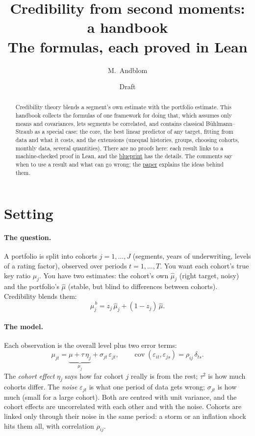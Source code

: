 \documentclass[11pt]{article}
\title{Credibility from second moments: a handbook\\
  {\large The formulas, each proved in Lean}}
\author{M.~Andblom}
\date{Draft}
\theoremstyle{remark}
\newcommand{\hmu}{\hat\mu}
\newcommand{\cov}{\operatorname{cov}}
\begin{document}
\maketitle

\begin{abstract}
  Credibility theory blends a segment's own estimate with the portfolio
  estimate. This handbook collects the formulas of one framework for doing
  that, which assumes only means and covariances, lets segments be correlated,
  and contains classical Bühlmann--Straub as a special case: the core, the best
  linear predictor of any target, fitting from data and what it costs, and the
  extensions (unequal histories, groups, choosing cohorts, monthly data,
  several quantities). There are no proofs here: each result links to a
  machine-checked proof in Lean, and the
  \href{https://mikaelandblom-coder.github.io/credible-lean/}{blueprint}
  has the details. The comments say when to use a result and what can go
  wrong; the \href{https://mikaelandblom-coder.github.io/credible-lean/paper.pdf}{paper}
  explains the ideas behind them.
\end{abstract}

\tableofcontents

\section{Setting}\label{sec:setting}

\paragraph{The question.} A portfolio is split into cohorts
$j = 1, \dots, J$ (segments, years of underwriting, levels of a rating
factor), observed over periods $t = 1, \dots, T$. You want each cohort's
true key ratio $\mu_j$. You have two estimates: the cohort's own $\hmu_j$
(right target, noisy) and the portfolio's $\hmu$ (stable, but blind to
differences between cohorts). Credibility blends them:
\[
  \hmu_j^{\,b} = z_j\,\hmu_j + (1 - z_j)\,\hmu .
\]

\paragraph{The model.} Each observation is the overall level plus two
error terms:
\[
  \mu_{jt} = \underbrace{\mu + \tau\,\eta_j}_{\mu_j} + \sigma_{jt}\,\varepsilon_{jt},
  \qquad
  \cov(\varepsilon_{it}, \varepsilon_{js}) = \rho_{ij}\,\delta_{ts}.
\]
The \emph{cohort effect} $\eta_j$ says how far cohort $j$ really is from the
rest; $\tau^2$ is how much cohorts differ. The \emph{noise}
$\varepsilon_{jt}$ is what one period of data gets wrong; $\sigma_{jt}$ is
how much (small for a large cohort). Both are centred with unit variance,
and the cohort effects are uncorrelated with each other and with the noise.
Cohorts are linked only through their noise in the same period: a
storm or an inflation shock hits them all, with correlation $\rho_{ij}$.
\end{document}
